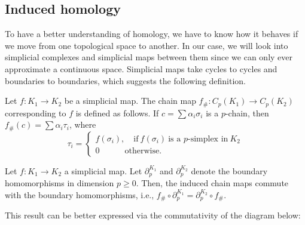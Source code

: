 \subsection{Induced homology}
To have a better understanding of homology, we have to know how it behaves if we move from one topological space to another. In our case, we will look into simplicial complexes and simplicial maps between them since we can only ever approximate a continuous space. Simplicial maps take cycles to cycles and boundaries to boundaries, which suggests the following definition.

\begin{definition}
  Let $f:K_{1} \to K_{2}$ be a simplicial map. The chain map $f_{\#}: C_{p}(K_{1}) \to C_{p}(K_{2})$ corresponding to $f$ is defined as follows. If $c = \sum \alpha_{i}\sigma_{i}$ is a $p$-chain, then $f_{\#}(c) = \sum \alpha_{i} \tau_{i}$, where
  \begin{equation*}
    \tau_{i} =
    \begin{cases}
      f(\sigma_{i}), \quad \text{if} \: f(\sigma_{i}) \: \text{is a $p$-simplex in} \: K_{2} \\
      0 \qquad \quad \text{otherwise}.
    \end{cases}
  \end{equation*}
\end{definition}

\begin{lemma}
Let $f: K_{1} \to K_{2}$ a simplicial map. Let $\partial_{p}^{K_{1}}$ and $\partial_{p}^{K_{2}}$ denote the boundary homomorphisms in dimension $p \geq 0$. Then, the induced chain maps commute with the boundary homomorphisms, i.e., $f_{\#} \circ \partial_{p}^{K_{1}} = \partial_{p}^{K_{2}} \circ f_{\#}$.
\end{lemma}

This result can be better expressed via the commutativity of the diagram below:

\begin{figure}[h]
\centering
{}
\end{figure}

